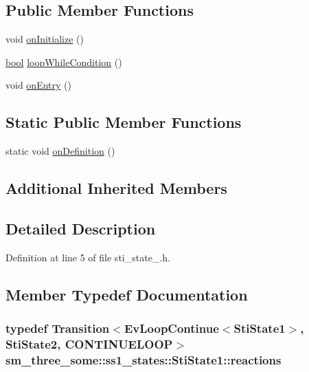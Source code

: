 \subsection*{Public Member Functions}
\begin{DoxyCompactItemize}
\item 
void \hyperlink{structsm__three__some_1_1ss1__states_1_1StiState1_abdb8227414e9fa07898683871c58c816}{on\+Initialize} ()
\item 
\hyperlink{classbool}{bool} \hyperlink{structsm__three__some_1_1ss1__states_1_1StiState1_a815626146e4b45d386ca4b529e330541}{loop\+While\+Condition} ()
\item 
void \hyperlink{structsm__three__some_1_1ss1__states_1_1StiState1_a1d66f8c091e275ffba7f45f5a83872fb}{on\+Entry} ()
\end{DoxyCompactItemize}
\subsection*{Static Public Member Functions}
\begin{DoxyCompactItemize}
\item 
static void \hyperlink{structsm__three__some_1_1ss1__states_1_1StiState1_aec293845a2865d7c15d0174b5c6c41c3}{on\+Definition} ()
\end{DoxyCompactItemize}
\subsection*{Additional Inherited Members}


\subsection{Detailed Description}


Definition at line 5 of file sti\+\_\+state\+\_.\+h.



\subsection{Member Typedef Documentation}
\subsubsection[{\texorpdfstring{reactions}{reactions}}]{\setlength{\rightskip}{0pt plus 5cm}typedef Transition$<$Ev\+Loop\+Continue$<${\bf Sti\+State1}$>$, {\bf Sti\+State2}, C\+O\+N\+T\+I\+N\+U\+E\+L\+O\+OP$>$ {\bf sm\+\_\+three\+\_\+some\+::ss1\+\_\+states\+::\+Sti\+State1\+::reactions}}\hypertarget{structsm__three__some_1_1ss1__states_1_1StiState1_aa86a8bb06736fba512abc8842f26fe1c}{}\label{structsm__three__some_1_1ss1__states_1_1StiState1_aa86a8bb06736fba512abc8842f26fe1c}


